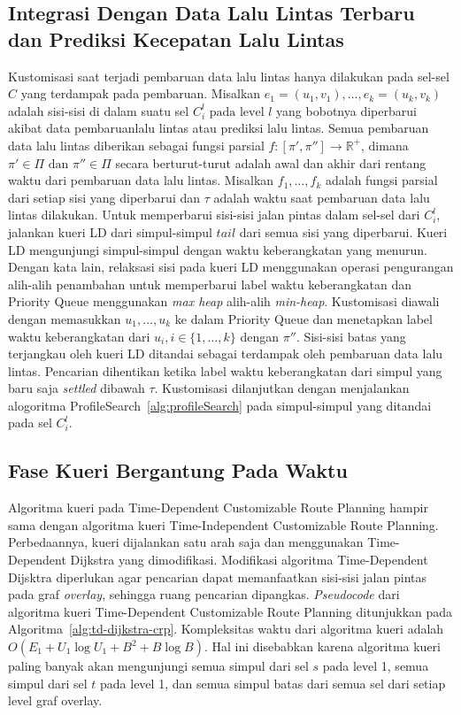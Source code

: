 \subsection{Integrasi Dengan Data Lalu Lintas Terbaru dan Prediksi Kecepatan Lalu Lintas}
\label{subsec:tdcrp-traffic-update}
Kustomisasi saat terjadi pembaruan data lalu lintas hanya dilakukan pada sel-sel $C$ yang terdampak pada pembaruan. Misalkan $e_1=(u_1,v_1),\ldots,e_k=(u_k,v_k)$ adalah sisi-sisi di dalam suatu sel $C_i^l \text{ pada level }l$ yang bobotnya diperbarui akibat data pembaruanlalu lintas atau prediksi lalu lintas. Semua pembaruan data lalu lintas diberikan sebagai fungsi parsial $f:[\pi',\pi'']\rightarrow \mathbb{R}^+$, dimana $\pi'\in \Pi \text{ dan }\pi''\in \Pi$ secara berturut-turut adalah awal dan akhir dari rentang waktu dari pembaruan data lalu lintas. Misalkan $f_1,\ldots,f_k$ adalah fungsi parsial dari setiap sisi yang diperbarui dan $\tau$ adalah waktu saat pembaruan data lalu lintas dilakukan.  Untuk memperbarui sisi-sisi jalan pintas dalam sel-sel dari $C_i^l$, jalankan kueri LD dari simpul-simpul $tail$ dari semua sisi yang diperbarui. Kueri LD mengunjungi simpul-simpul dengan waktu keberangkatan yang menurun. Dengan kata lain, relaksasi sisi pada kueri LD menggunakan operasi pengurangan alih-alih penambahan untuk memperbarui label waktu keberangkatan dan Priority Queue menggunakan \textit{max heap} alih-alih \textit{min-heap}. Kustomisasi diawali dengan memasukkan $u_1,\ldots,u_k$ ke dalam Priority Queue dan menetapkan label waktu keberangkatan dari $u_i,i\in\{1,\ldots,k\}$ dengan $\pi''$. Sisi-sisi batas yang terjangkau oleh kueri LD ditandai sebagai terdampak oleh pembaruan data lalu lintas. Pencarian dihentikan ketika label waktu keberangkatan dari simpul yang baru saja \textit{settled} dibawah $\tau$. Kustomisasi dilanjutkan dengan menjalankan alogoritma ProfileSearch~\ref{alg:profileSearch} pada simpul-simpul yang ditandai pada sel $C_i^l$.

\subsection{Fase Kueri Bergantung Pada Waktu}
\label{subsec:tdcrp-time-dependent-query}
Algoritma kueri pada Time-Dependent Customizable Route Planning hampir sama dengan algoritma kueri Time-Independent Customizable Route Planning. Perbedaannya, kueri dijalankan satu arah saja dan menggunakan Time-Dependent Dijkstra yang dimodifikasi. Modifikasi algoritma Time-Dependent Dijsktra diperlukan agar pencarian dapat memanfaatkan sisi-sisi jalan pintas pada graf \textit{overlay}, sehingga ruang pencarian dipangkas. \textit{Pseudocode} dari algoritma kueri Time-Dependent Customizable Route Planning ditunjukkan pada Algoritma~\ref{alg:td-dijkstra-crp}. Kompleksitas waktu dari algoritma kueri adalah $O(E_1+U_1\log U_1+B^{2}+B \log B)$. Hal ini disebabkan karena algoritma kueri paling banyak akan mengunjungi semua simpul dari sel $s$ pada level 1, semua simpul dari sel $t$ pada level 1, dan semua simpul batas dari semua sel dari setiap level graf overlay. 



